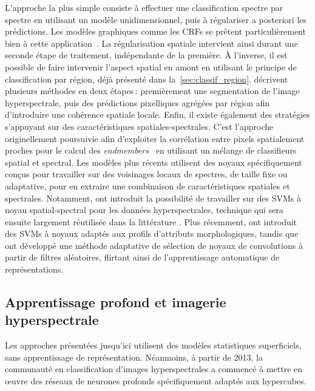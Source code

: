 L'approche la plus simple consiste à effectuer une classification spectre par spectre en utilisant un modèle unidimensionnel, puis à régulariser a posteriori les prédictions. Les modèles graphiques comme les \glspl{CRF} se prêtent particulièrement bien à cette application~\cite{wu_semi-supervised_2016}. La régularisation spatiale intervient ainsi durant une seconde étape de traitement, indépendante de la première.
À l'inverse, il est possible de faire intervenir l'aspect spatial en amont en utilisant le principe de classification par région, déjà présenté dans la~\cref{sec:classif_region}. \citet{tarabalka_segmentation_2010,fauvel_advances_2013} décrivent plusieurs méthodes en deux étapes\,: premièrement une segmentation de l'image hyperspectrale, puis des prédictions pixelliques agrégées par région afin d'introduire une cohérence spatiale locale.
Enfin, il existe également des stratégies s'appuyant sur des caractéristiques spatiales-spectrales. C'est l'approche originellement poursuivie afin d'exploiter la corrélation entre pixels spatialement proches pour le calcul des \textit{endmembers}~\cite{plaza_spatial/spectral_2002,dellacqua_exploiting_2004} en utilisant un mélange de classifieurs spatial et spectral. Les modèles plus récents utilisent des noyaux spécifiquement conçus pour travailler sur des voisinages locaux de spectres, de taille fixe ou adaptative, pour en extraire une combinaison de caractéristiques spatiales et spectrales. Notamment, \citet{camps-valls_composite_2006} ont introduit la possibilité de travailler sur des \glspl{SVM} à noyau spatial-spectral pour les données hyperspectrales, technique qui sera ensuite largement réutilisée dans la littérature \cite{tarabalka_spectralspatial_2009,fauvel_spatial-spectral_2012}. Plus récemment, \citet{cui_scalable_2017} ont introduit des \glspl{SVM} à noyaux adaptés aux profils d'attributs morphologiques, tandis que~\citet{tuia_multiclass_2015} ont développé une méthode adaptative de sélection de noyaux de convolutions à partir de filtres aléatoires, flirtant ainsi de l'apprentissage automatique de représentations.

\subsection{Apprentissage profond et imagerie hyperspectrale}
\label{sec:deep_hsi}

Les approches présentées jusqu'ici utilisent des modèles statistiques superficiels, sans apprentissage de représentation. Néanmoins, à partir de 2013, la communauté en classification d'images hyperspectrales a commencé à mettre en \oe{}uvre des réseaux de neurones profonds spécifiquement adaptés aux hypercubes.

